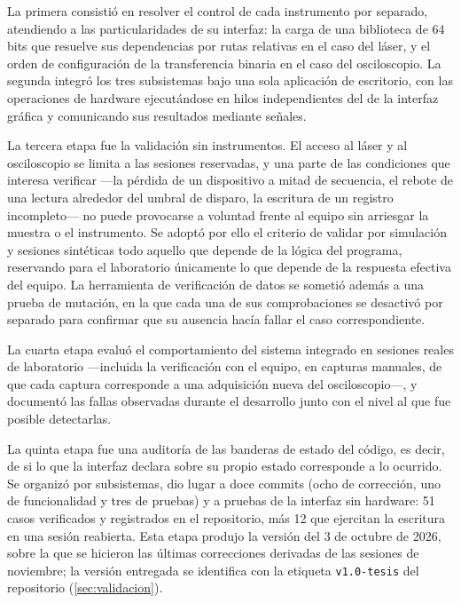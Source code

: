 La primera consistió en resolver el control de cada instrumento por
separado, atendiendo a las particularidades de su interfaz: la carga de
una biblioteca de 64 bits que resuelve sus dependencias por rutas
relativas en el caso del láser, y el orden de configuración de la
transferencia binaria en el caso del osciloscopio. La segunda integró
los tres subsistemas bajo una sola aplicación de escritorio, con las
operaciones de hardware ejecutándose en hilos independientes del de la
interfaz gráfica y comunicando sus resultados mediante señales.

La tercera etapa fue la validación sin instrumentos. El acceso al láser
y al osciloscopio se limita a las sesiones reservadas, y una parte de
las condiciones que interesa verificar —la pérdida de un dispositivo a
mitad de secuencia, el rebote de una lectura alrededor del umbral de
disparo, la escritura de un registro incompleto— no puede provocarse a
voluntad frente al equipo sin arriesgar la muestra o el instrumento. Se
adoptó por ello el criterio de validar por simulación y sesiones
sintéticas todo aquello que depende de la lógica del programa,
reservando para el laboratorio únicamente lo que depende de la respuesta
efectiva del equipo. La herramienta de verificación de datos se sometió
además a una prueba de mutación, en la que cada una de sus
comprobaciones se desactivó por separado para confirmar que su ausencia
hacía fallar el caso correspondiente.

La cuarta etapa evaluó el comportamiento del sistema integrado en
sesiones reales de laboratorio ---incluida la verificación con el
equipo, en capturas manuales, de que cada captura corresponde a una
adquisición nueva del osciloscopio---, y
documentó las fallas observadas durante el desarrollo junto con el nivel
al que fue posible detectarlas.

La quinta etapa fue una auditoría de las banderas de estado del código,
es decir, de si lo que la interfaz declara sobre su propio estado
corresponde a lo ocurrido. Se organizó por subsistemas, dio lugar a doce
commits (ocho de corrección, uno de funcionalidad y tres de pruebas) y a pruebas de la interfaz sin hardware: 51 casos
verificados y registrados en el repositorio, más 12 que ejercitan la escritura en una
sesión reabierta. Esta etapa produjo la versión del 3 de octubre de
2026, sobre la que se hicieron las últimas correcciones derivadas de
las sesiones de noviembre; la versión entregada se identifica con la
etiqueta \texttt{v1.0-tesis} del repositorio
(\cref{sec:validacion}).

